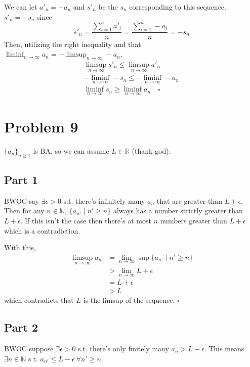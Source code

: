 \documentclass[12pt]{article}
\newcommand{\N}{\mathbb{N}}
\newcommand{\R}{\mathbb{R}}
\begin{document}
We can let $a'_n = -a_n$ and $s'_n$ be the $s_n$ corresponding to this sequence.
$s'_n=-s_n$ since
\[s'_n=\frac{\sum_{i=1}^{n} a'_i}{n}=\frac{\sum_{i=1}^{n} -a_i}{n} = -s_n\]
Then, utilizing the right inequality and that $\liminf_{n \to \infty} a_n = -\limsup_{n \to \infty} -a_n$,
\begin{gather*}
  \limsup_{n \to \infty} s'_n \le \limsup_{n \to \infty} a'_n \\
  -\liminf_{n \to \infty} -s_n \le -\liminf_{n \to \infty} -a_n \\
  \liminf_{n \to \infty} s_n \ge \liminf_{n \to \infty} a_n\quad\square
\end{gather*}

\pagebreak

\section{Problem 9}

$\{a_n\}_{n \ge 1}$ is BA, so we can assume $L \in \R$ (thank god).

\subsection{Part 1}\label{sec:prob9p1}

BWOC say $\exists \epsilon > 0$ s.t. there's infinitely many $a_n$ that are greater than $L+\epsilon$.
Then for any $n \in \N$, $\{a_{n'} \mid n' \ge n\}$ always has a number strictly greater than $L+\epsilon$.
If this isn't the case then there's at most $n$ numbers greater than $L+\epsilon$ which is a contradiction.

With this,
\begin{align*}
  \limsup_{n \to \infty} a_n
   & = \lim_{n \to \infty} \sup \{a_{n'} \mid n' \ge n\} \\
   & > \lim_{n \to \infty} L+\epsilon                    \\
   & = L+\epsilon                                        \\
   & > L
\end{align*}
which contradicts that $L$ is the limsup of the sequence. $\square$

\subsection{Part 2}\label{sec:prob9p2}

BWOC suppose $\exists \epsilon > 0$ s.t. there's only finitely many $a_n > L-\epsilon$.
This means $\exists n \in \N$ s.t. $a_{n'} \le L-\epsilon\ \forall n' \ge n$.
\end{document}
